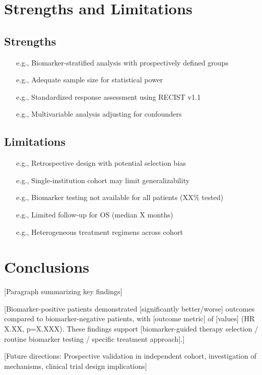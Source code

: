 \documentclass[10pt,letterpaper]{article}
\begin{document}
\section{Strengths and Limitations}

\subsection{Strengths}
\begin{itemize}
\item [e.g., Biomarker-stratified analysis with prospectively defined groups]
\item [e.g., Adequate sample size for statistical power]
\item [e.g., Standardized response assessment using RECIST v1.1]
\item [e.g., Multivariable analysis adjusting for confounders]
\end{itemize}

\subsection{Limitations}
\begin{itemize}
\item [e.g., Retrospective design with potential selection bias]
\item [e.g., Single-institution cohort may limit generalizability]
\item [e.g., Biomarker testing not available for all patients (XX\% tested)]
\item [e.g., Limited follow-up for OS (median X months)]
\item [e.g., Heterogeneous treatment regimens across cohort]
\end{itemize}

\section{Conclusions}

[Paragraph summarizing key findings]

[Biomarker-positive patients demonstrated [significantly better/worse] outcomes compared to biomarker-negative patients, with [outcome metric] of [values] (HR X.XX, p=X.XXX). These findings support [biomarker-guided therapy selection / routine biomarker testing / specific treatment approach].]

[Future directions: Prospective validation in independent cohort, investigation of mechanisms, clinical trial design implications]
\end{document}
